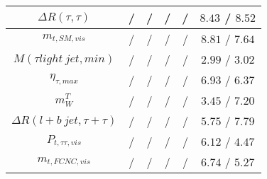 \begin{tabular}{|c|c|c|c|c|c|}
$\Delta R(\tau ,\tau )$ &  / &  / &  / &  / & $8.43$ / $8.52$\\\hline
$m_{t,SM,vis}$ &  / &  / &  / &  / & $8.81$ / $7.64$\\\hline
$M(\tau  light~jet,min)$ &  / &  / &  / &  / & $2.99$ / $3.02$\\\hline
$\eta_{\tau ,max}$ &  / &  / &  / &  / & $6.93$ / $6.37$\\\hline
$m^{T}_{W}$ &  / &  / &  / &  / & $3.45$ / $7.20$\\\hline
$\Delta R(l+b~jet,\tau +\tau )$ &  / &  / &  / &  / & $5.75$ / $7.79$\\\hline
$P_{t,\tau \tau ,vis}$ &  / &  / &  / &  / & $6.12$ / $4.47$\\\hline
$m_{t,FCNC,vis}$ &  / &  / &  / &  / & $6.74$ / $5.27$\\\hline
\end{tabular}
